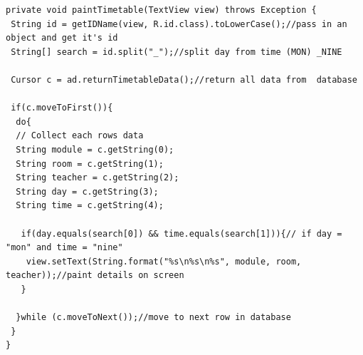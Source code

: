 \begin{verbatim}
private void paintTimetable(TextView view) throws Exception {
 String id = getIDName(view, R.id.class).toLowerCase();//pass in an object and get it's id
 String[] search = id.split("_");//split day from time (MON) _NINE
 
 Cursor c = ad.returnTimetableData();//return all data from  database
 
 if(c.moveToFirst()){
  do{
  // Collect each rows data
  String module = c.getString(0);
  String room = c.getString(1);
  String teacher = c.getString(2);
  String day = c.getString(3);
  String time = c.getString(4);
 
   if(day.equals(search[0]) && time.equals(search[1])){// if day = "mon" and time = "nine"
    view.setText(String.format("%s\n%s\n%s", module, room, teacher));//paint details on screen
   }
 
  }while (c.moveToNext());//move to next row in database
 }
}
\end{verbatim}

